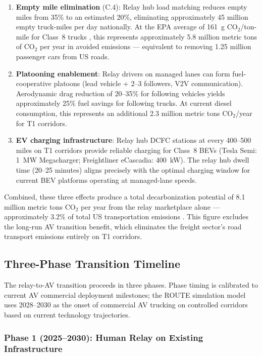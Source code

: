 \begin{enumerate}
\item \textbf{Empty mile elimination} (C.4): Relay hub load matching reduces empty miles from 35\% to an estimated 20\%, eliminating approximately 45 million empty truck-miles per day nationally. At the EPA average of 161~g CO$_2$/ton-mile for Class~8 trucks \citep{EPA_MOVES3}, this represents approximately 5.8 million metric tons of CO$_2$ per year in avoided emissions --- equivalent to removing 1.25 million passenger cars from US roads.

\item \textbf{Platooning enablement}: Relay drivers on managed lanes can form fuel-cooperative platoons (lead vehicle + 2--3 followers, V2V communication). Aerodynamic drag reduction of 20--35\% for following vehicles \citep{Browand2004} yields approximately 25\% fuel savings for following trucks. At current diesel consumption, this represents an additional 2.3 million metric tons CO$_2$/year for T1 corridors.

\item \textbf{EV charging infrastructure}: Relay hub DCFC stations at every 400--500 miles on T1 corridors provide reliable charging for Class~8 BEVs (Tesla Semi: 1~MW Megacharger; Freightliner eCascadia: 400~kW). The relay hub dwell time (20--25 minutes) aligns precisely with the optimal charging window for current BEV platforms operating at managed-lane speeds.
\end{enumerate}

Combined, these three effects produce a total decarbonization potential of 8.1 million metric tons CO$_2$ per year from the relay marketplace alone --- approximately 3.2\% of total US transportation emissions \citep{EPA_GHG2023}. This figure excludes the long-run AV transition benefit, which eliminates the freight sector's road transport emissions entirely on T1 corridors.

\subsection{Three-Phase Transition Timeline}

The relay-to-AV transition proceeds in three phases. Phase timing is calibrated to current AV
commercial deployment milestones; the ROUTE simulation model uses 2028--2030 as the onset of
commercial AV trucking on controlled corridors based on current technology trajectories.

\subsubsection*{Phase 1 (2025--2030): Human Relay on Existing Infrastructure}

